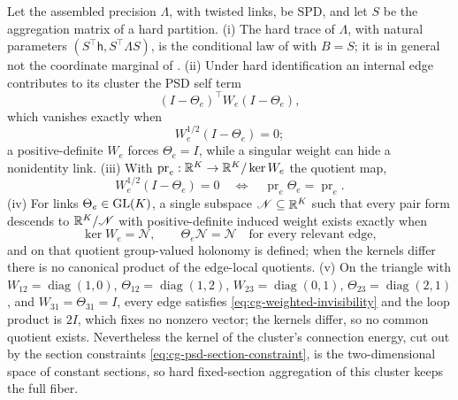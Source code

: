 Let the assembled precision \(\Lambda\), with twisted links, be SPD, and let
\(S\) be the aggregation matrix of a hard partition.
(i) The hard trace of \(\Lambda\), with natural parameters
\((S^\top\mathsf h,S^\top\Lambda S)\), is the conditional law of
 with \(B=S\); it is in general not the
coordinate marginal of .
(ii) Under hard identification an internal edge contributes to its cluster the
PSD self term
\begin{equation}
(I-\Theta_e)^\top W_e(I-\Theta_e),
\label{eq:cg-internal-residual}
\end{equation}
which vanishes exactly when
\begin{equation}
W_e^{1/2}(I-\Theta_e)=0 ;
\label{eq:cg-weighted-invisibility}
\end{equation}
a positive-definite \(W_e\) forces \(\Theta_e=I\), while a singular weight can
hide a nonidentity link.
(iii) With \(\operatorname{pr}_e:\mathbb R^K\to\mathbb R^K/\ker W_e\) the quotient map,
\begin{equation}
W_e^{1/2}(I-\Theta_e)=0
\quad\Longleftrightarrow\quad
\operatorname{pr}_e\Theta_e=\operatorname{pr}_e .
\label{eq:cg-edge-quotient}
\end{equation}
(iv) For links \(\Theta_e\in\mathrm{GL}(K)\), a single subspace \(\mathscr N\subseteq\mathbb R^K\)
such that every pair form descends to \(\mathbb R^K/\mathscr N\) with positive-definite
induced weight exists exactly when
\begin{equation}
\ker W_e=\mathscr N,\qquad \Theta_e\mathscr N=\mathscr N
\quad\text{for every relevant edge},
\label{eq:cg-common-quotient}
\end{equation}
and on that quotient group-valued holonomy is defined; when the kernels differ
there is no canonical product of the edge-local quotients.
(v) On the triangle with
\(W_{12}=\operatorname{diag}(1,0)\), \(\Theta_{12}=\operatorname{diag}(1,2)\),
\(W_{23}=\operatorname{diag}(0,1)\), \(\Theta_{23}=\operatorname{diag}(2,1)\), and
\(W_{31}=\Theta_{31}=I\), every edge satisfies \eqref{eq:cg-weighted-invisibility}
and the loop product is \(2I\), which fixes no nonzero vector; the kernels
differ, so no common quotient exists. Nevertheless the kernel of the cluster's
connection energy, cut out by the section constraints
\eqref{eq:cg-psd-section-constraint}, is the two-dimensional space of constant
sections, so hard fixed-section aggregation of this cluster keeps the full
fiber. 

